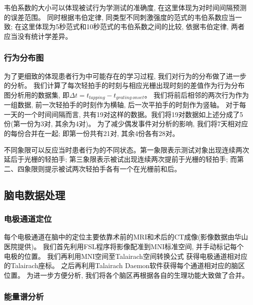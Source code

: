韦伯系数的大小可以体现被试行为学测试的准确度, 在这里体现为对时间间隔预测的误差范围。
同时根据韦伯定律, 同类型不同刺激强度的范式的韦伯系数应当一致;
在这里体现为5秒范式和10秒范式的韦伯系数之间的比较, 依据韦伯定律, 两者应当没有统计学差异。

\subsubsection{行为分布图}
为了更细致的体现患者行为中可能存在的学习过程, 我们对行为的分布做了进一步的分析。
我们计算了每次轻拍手的时刻与相应光栅出现时刻的差值作为行为分布图分析用的数据集, 即$\Delta t = t_{tapping} - t_{grating\ onset}$。
我们将前后相邻的两次行为作为一组数据, 前一次轻拍手的时刻作为横轴, 后一次平拍手的时刻作为竖轴。
对于每一天的一个时间间隔而言, 共有19对这样的数据。我们将19对数据如上述分成了5份(第一份为3对, 其余为4对)。
为了减少偶发事件对分析的影响, 我们将7天相对应的每份合并在一起; 即第一份共有21对, 其余4份各有28对。

不同象限可以反应当时患者行为的不同状态。第一象限表示测试对象出现连续两次延后于光栅的轻拍手;
第三象限表示被试出现连续两次提前于光栅的轻拍手;
而第二、四象限则提示被试两次轻拍手各有一个在光栅前和后。

\subsection{脑电数据处理}

\subsubsection{电极通道定位}

每个电极通道在脑中的定位主要依靠术前的MRI和术后的CT成像(影像数据由华山医院提供)。
我们首先利用FSL程序\cite{fsl}将影像配准到MNI标准空间, 并手动标记每个电极的位置。
我们再利用MNI空间至Talairach空间转换公式\cite{bioelectromagnetism}
获得电极通道相对应的Talairach座标。
之后再利用Talairach Daemon软件\cite{talairach_daemon}获得每个通道相对应的脑区位置。
为进一步方便分析, 我们将各个脑区再根据各自的生理功能大致做了合并。

\subsubsection{能量谱分析}

